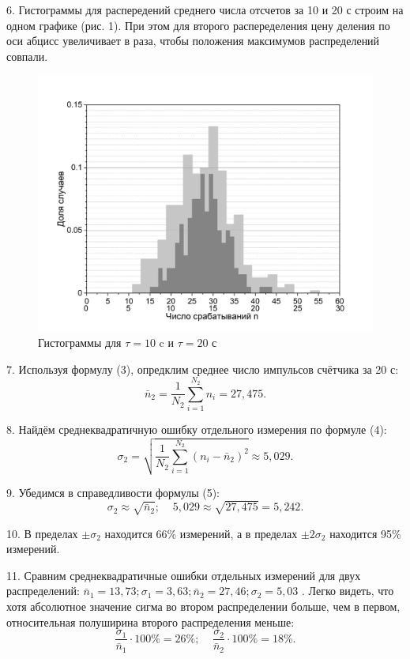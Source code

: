\documentclass[a4paper,12pt]{article} %
\begin{document}
6. Гистограммы для распередений среднего числа отсчетов за 10 и 20 с строим на одном графике (рис. 1). При этом для второго распеределения цену деления по оси абцисс увеличивает в  раза, чтобы положения максимумов распределений совпали.
\begin{figure}[p]
\centering
\includegraphics[width=15cm]{Graph1.png}
\caption{Гистограммы для $\tau = 10$ c и $\tau = 20$ с}
\end{figure}


7. Используя формулу (3), опредклим среднее число импульсов счётчика за 20 с:
\[ \bar{n}_2=\frac{1}{N_2} \sum_{i=1}^{N_2} n_i = 27,475. \]

8. Найдём среднеквадратичную ошибку отдельного измерения по формуле (4):
\[  \sigma_{2} = \sqrt{\frac{1}{N_2}\sum_{i=1}^{N_2} \left( n_i - \bar{n}_2 \right)^2} \approx 5,029.  \]

9. Убедимся в справедливости формулы (5):
\[  \sigma_2 \approx \sqrt{\bar{n}_2}; \;\;\;\; 5,029 \approx \sqrt{27,475} = 5,242.\]

10. В пределах $ \pm \sigma_2 $ находится 66\% измерений, а в пределах $ \pm 2\sigma_2  $ находится 95\% измерений.

11. Сравним среднеквадратичные ошибки отдельных измерений для двух распределений: $ \bar{n}_1 = 13,73; \sigma_1 = 3,63; \bar{n}_2 =27,46; \sigma_2 = 5,03 $ . Легко видеть, что хотя абсолютное значение сигма во втором распределении больше, чем в первом, относительная полуширина второго распределения меньше:
\[  \frac{\sigma_1}{\bar{n}_1} \cdot 100\% = 26\%; \;\;\;\; \frac{\sigma_2}{\bar{n}_2} \cdot 100\% = 18\%. \]
\end{document}
